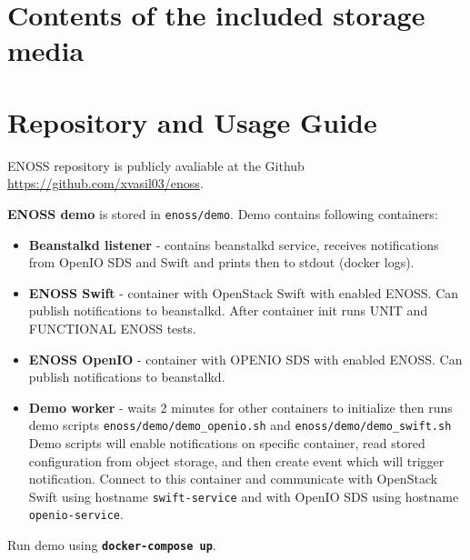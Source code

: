 
\chapter{Contents of the included storage media}

\chapter{Repository and Usage Guide}
ENOSS repository is publicly avaliable at the Github {\url{https://github.com/xvasil03/enoss}}.

\textbf{ENOSS demo} is stored in \texttt{enoss/demo}. Demo contains following containers:
\begin{itemize}
    \item \textbf{Beanstalkd listener} - contains beanstalkd service, receives notifications from OpenIO SDS and Swift and prints then to stdout (docker logs).
    \item \textbf{ENOSS Swift} - container with OpenStack Swift with enabled ENOSS. Can publish notifications to beanstalkd. After container init runs UNIT and FUNCTIONAL ENOSS tests.
    \item \textbf{ENOSS OpenIO} - container with OPENIO SDS with enabled ENOSS. Can publish notifications to beanstalkd.
    \item \textbf{Demo worker} - waits 2 minutes for other containers to initialize then runs demo scripts \texttt{enoss/demo/demo\_openio.sh} and \texttt{enoss/demo/demo\_swift.sh} Demo scripts will enable notifications on specific container, read stored configuration from object storage, and then create event which will trigger notification. Connect to this container and communicate with OpenStack Swift using hostname \texttt{swift-service} and with OpenIO SDS using hostname \texttt{openio-service}.
\end{itemize}
Run demo using \textbf{\texttt{docker-compose up}}.

